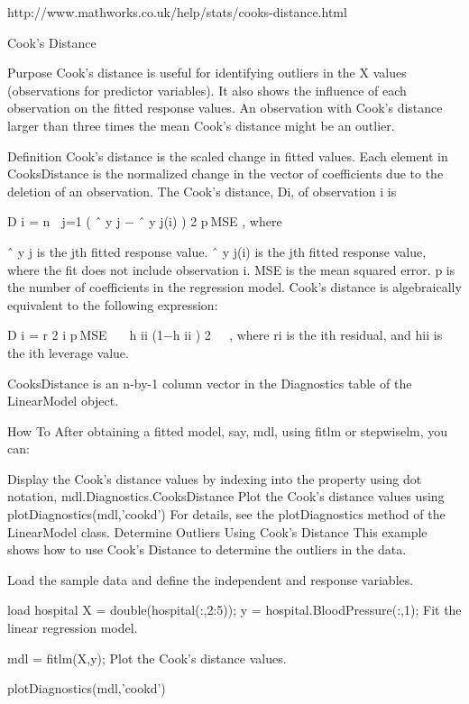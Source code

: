 http://www.mathworks.co.uk/help/stats/cooks-distance.html

Cook's Distance

Purpose
Cook's distance is useful for identifying outliers in the X values (observations for predictor variables). It also shows the influence of each observation on the fitted response values. An observation with Cook's distance larger than three times the mean Cook's distance might be an outlier.

Definition
Cook's distance is the scaled change in fitted values. Each element in CooksDistance is the normalized change in the vector of coefficients due to the deletion of an observation. The Cook's distance, Di, of observation i is

D
i
=
n

j=1
(
ˆ
y
j
−
ˆ
y
j(i)
)
2
p MSE
,
where

ˆ
y
j
 is the jth fitted response value.
ˆ
y
j(i)
 is the jth fitted response value, where the fit does not include observation i.
MSE is the mean squared error.
p is the number of coefficients in the regression model.
Cook's distance is algebraically equivalent to the following expression:

D
i
=
r
2
i
p MSE

h
ii
(1−h
ii
)
2
,
where ri is the ith residual, and hii is the ith leverage value.

CooksDistance is an n-by-1 column vector in the Diagnostics table of the LinearModel object.

How To
After obtaining a fitted model, say, mdl, using fitlm or stepwiselm, you can:

Display the Cook's distance values by indexing into the property using dot notation,
mdl.Diagnostics.CooksDistance
Plot the Cook's distance values using
plotDiagnostics(mdl,'cookd')
For details, see the plotDiagnostics method of the LinearModel class.
Determine Outliers Using Cook's Distance
This example shows how to use Cook's Distance to determine the outliers in the data.

Load the sample data and define the independent and response variables.

load hospital
X = double(hospital(:,2:5));
y = hospital.BloodPressure(:,1);
Fit the linear regression model.

mdl = fitlm(X,y);
Plot the Cook's distance values.

plotDiagnostics(mdl,'cookd')
